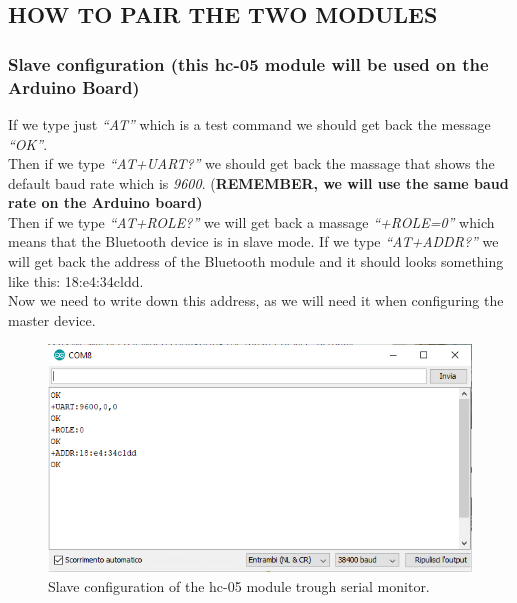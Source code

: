 \subsection{HOW TO PAIR THE TWO MODULES}

\subsubsection{Slave configuration (this hc-05 module will be used on the Arduino Board)}
If we type just \textit{“AT”} which is a test command we should get back the message \textit{“OK”}.\\
Then if we type \textit{“AT+UART?”} we should get back the massage that shows the default baud rate which is \textit{9600}. (\textbf{REMEMBER, we will use the same baud rate on the Arduino board)}\\
Then if we type \textit{“AT+ROLE?”} we will get back a massage \textit{“+ROLE=0”} which means that the Bluetooth device is in slave mode. If we type \textit{“AT+ADDR?”} we will get back the address of the Bluetooth module and it should looks something like this: 18:e4:34cldd. \\
Now we need to write down this address, as we will need it when configuring the master device.
\begin{figure}[H]
	\centering
	\includegraphics[width=\textwidth]
	{files/images/hc05_slave}
	\caption{Slave configuration of the hc-05 module trough serial monitor.}
\end{figure}

